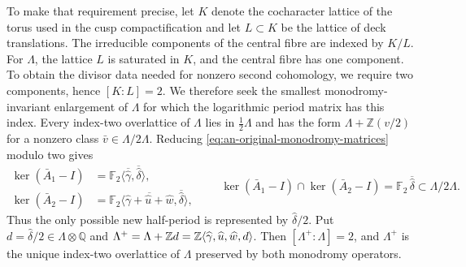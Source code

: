 To make that requirement precise, let $K$ denote the cocharacter lattice
of the torus used in the cusp compactification and let $L\subset K$ be the
lattice of deck translations.  The irreducible components of the central
fibre are indexed by $K/L$.  For $\Lambda$, the lattice $L$ is
saturated in $K$, and the central fibre has one component.  To obtain the
divisor data needed for nonzero second cohomology, we require two components,
hence $[K:L]=2$.  We therefore seek the smallest monodromy-invariant
enlargement of $\Lambda$ for which the logarithmic period matrix has this
index.  Every index-two overlattice of
$\Lambda$ lies in $\tfrac12\Lambda$ and has the form
$\Lambda+\mathbb Z(v/2)$ for a nonzero class
$\bar v\in\Lambda/2\Lambda$.  Reducing
\eqref{eq:an-original-monodromy-matrices} modulo two gives
\[
 \begin{aligned}
 \ker(\bar A_1-I)
  &=\mathbb F_2\langle\overline{\widehat\gamma},
       \overline{\widehat\delta}\rangle,\\
 \ker(\bar A_2-I)
  &=\mathbb F_2\langle
       \overline{\widehat\gamma+\widehat u+\widehat w},
       \overline{\widehat\delta}\rangle,
 \end{aligned}
 \qquad
 \ker(\bar A_1-I)\cap\ker(\bar A_2-I)
 =\mathbb F_2\,\overline{\widehat\delta}
 \subset\Lambda/2\Lambda.
\]
Thus the only possible new half-period is represented by
$\widehat\delta/2$.  Put
$d=\widehat\delta/2\in\Lambda\otimes\mathbb Q$ and
$\Lambda^+=\Lambda+\mathbb Z d
=\mathbb Z\langle\widehat\gamma,\widehat u,\widehat w,d\rangle$.
Then $[\Lambda^+:\Lambda]=2$, and $\Lambda^+$ is the unique index-two
overlattice of $\Lambda$ preserved by both monodromy operators.

